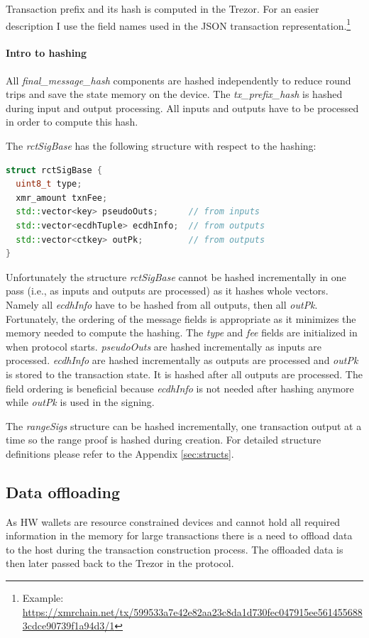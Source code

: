\documentclass[]{article}
\begin{document}
Transaction prefix and its hash is computed in the Trezor.
For an easier description I use the field names used in the JSON transaction representation.\footnote{Example: \url{https://xmrchain.net/tx/599533a7e42e82aa23c8da1d730fec047915ee5614556883cdce90739f1a94d3/1}}

\paragraph{Intro to hashing}
All \emph{final\_message\_hash} components are hashed independently to reduce round trips and save the state memory on the device.
The \emph{tx\_prefix\_hash} is hashed during input and output processing. All inputs and outputs have to be processed in order to compute this hash.

The \emph{rctSigBase} has the following structure with respect to the hashing:  
\begin{lstlisting}[language=c++]
struct rctSigBase {
  uint8_t type;
  xmr_amount txnFee;
  std::vector<key> pseudoOuts;      // from inputs
  std::vector<ecdhTuple> ecdhInfo;  // from outputs
  std::vector<ctkey> outPk;         // from outputs
}
\end{lstlisting}

Unfortunately the structure \emph{rctSigBase} cannot be hashed incrementally in one pass (i.e., as inputs and outputs are processed) as it hashes whole vectors. Namely all \emph{ecdhInfo} have to be hashed from all outputs, then all \emph{outPk}. Fortunately, the ordering of the message fields is appropriate as it minimizes the memory needed to compute the hashing. The \emph{type} and \emph{fee} fields are initialized in when protocol starts. \emph{pseudoOuts} are hashed incrementally as inputs are processed. \emph{ecdhInfo} are hashed incrementally as outputs are processed and \emph{outPk} is stored to the transaction state. It is hashed after all outputs are processed. The field ordering is beneficial because \emph{ecdhInfo} is not needed after hashing anymore while \emph{outPk} is used in the signing.

The \emph{rangeSigs} structure can be hashed incrementally, one transaction output at a time so the range proof is hashed during creation.
For detailed structure definitions please refer to the Appendix \ref{sec:structs}. 

\subsection{Data offloading}
As HW wallets are resource constrained devices and cannot hold all required information in the memory for large transactions there is a need to offload data to the host during the transaction construction process. The offloaded data is then later passed back to the Trezor in the protocol.
\end{document}
